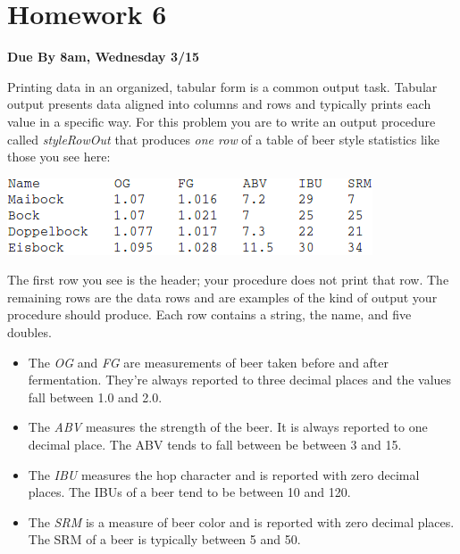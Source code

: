 \documentclass[nobib]{tufte-handout}
\begin{document}
\newpage

\section{Homework 6}

\begin{center}
\textbf{Due By 8am, Wednesday 3/15}
\end{center}

Printing data in an organized, tabular form is a common output task.  Tabular output presents data aligned into columns and rows and typically prints each value in a specific way.  For this problem you are to write an output procedure called \textit{styleRowOut} that produces \textit{one row} of a table of beer style statistics like those you see here:

\vspace{.1in}
\begin{center}
\includegraphics[scale=.5]{tabExample.png}
\end{center}
\vspace{.1in}

The first row you see is the header; your procedure does not print that row. The remaining rows are the data rows and are examples of the kind of output your procedure should produce. Each row contains a string, the name, and five doubles.
\begin{itemize}
\item  The \textit{OG} and \textit{FG} are measurements of beer taken before and after fermentation. They're always reported to three decimal places and the values fall between 1.0 and 2.0.
\item The \textit{ABV} measures the strength of the beer. It is always reported to one decimal place. The ABV tends to fall between be between 3 and 15.
\item The \textit{IBU} measures the hop character and is reported with zero decimal places. The IBUs of a beer tend to be between 10 and 120.
\item The \textit{SRM} is a measure of beer color and is reported with zero decimal places. The SRM of a beer is typically between 5 and 50.
\end{itemize}
\end{document}
